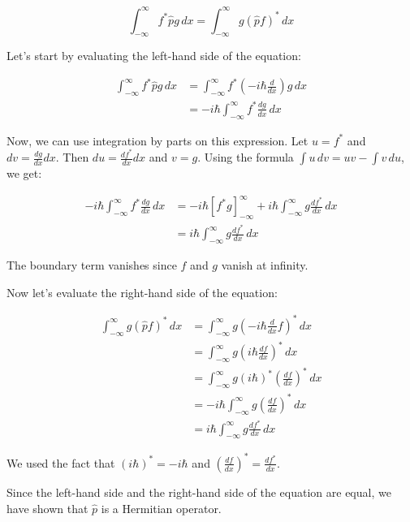 \documentclass{article}
\begin{document}
\begin{equation*}
\int_{-\infty}^{\infty} f^* \hat{p} g \, dx = \int_{-\infty}^{\infty} g (\hat{p} f)^* \, dx
\end{equation*}

Let's start by evaluating the left-hand side of the equation:

\begin{align*}
\int_{-\infty}^{\infty} f^* \hat{p} g \, dx &= \int_{-\infty}^{\infty} f^* \left( -i\hbar \frac{d}{dx} \right) g \, dx \\
&= -i\hbar \int_{-\infty}^{\infty} f^* \frac{dg}{dx} \, dx
\end{align*}

Now, we can use integration by parts on this expression.  Let $u = f^*$ and $dv = \frac{dg}{dx} dx$. Then $du = \frac{df^*}{dx} dx$ and $v = g$.  Using the formula $\int u \, dv = uv - \int v \, du$, we get:

\begin{align*}
-i\hbar \int_{-\infty}^{\infty} f^* \frac{dg}{dx} \, dx &= -i\hbar \left[ f^* g \right]_{-\infty}^{\infty} + i\hbar \int_{-\infty}^{\infty} g \frac{df^*}{dx} \, dx \\
&= i\hbar \int_{-\infty}^{\infty} g \frac{df^*}{dx} \, dx
\end{align*}

The boundary term vanishes since $f$ and $g$ vanish at infinity.

Now let's evaluate the right-hand side of the equation:

\begin{align*}
\int_{-\infty}^{\infty} g (\hat{p} f)^* \, dx &= \int_{-\infty}^{\infty} g \left( -i\hbar \frac{d}{dx} f \right)^* \, dx \\
&= \int_{-\infty}^{\infty} g \left( i\hbar \frac{df}{dx} \right)^* \, dx \\
&= \int_{-\infty}^{\infty} g \left( i\hbar \right)^* \left( \frac{df}{dx} \right)^* \, dx \\
&= -i\hbar \int_{-\infty}^{\infty} g  \left( \frac{df}{dx} \right)^* \, dx \\
&= i\hbar \int_{-\infty}^{\infty} g \frac{df^*}{dx} \, dx
\end{align*}

We used the fact that $(i\hbar)^* = -i\hbar$ and $\left( \frac{df}{dx} \right)^* = \frac{df^*}{dx}$.

Since the left-hand side and the right-hand side of the equation are equal, we have shown that $\hat{p}$ is a Hermitian operator.
\end{document}
